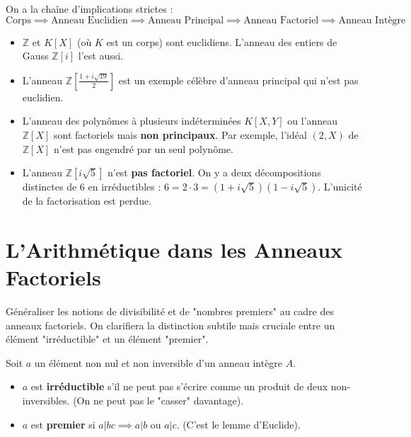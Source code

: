 \begin{theorem}
    On a la chaîne d'implications strictes :
    $$ \text{Corps} \implies \text{Anneau Euclidien} \implies \text{Anneau Principal} \implies \text{Anneau Factoriel} \implies \text{Anneau Intègre} $$
\end{theorem}

\begin{example}
    \begin{itemize}
        \item $\mathbb{Z}$ et $K[X]$ (où $K$ est un corps) sont euclidiens. L'anneau des entiers de Gauss $\mathbb{Z}[i]$ l'est aussi.
        \item L'anneau $\mathbb{Z}[\frac{1+i\sqrt{19}}{2}]$ est un exemple célèbre d'anneau principal qui n'est pas euclidien.
        \item L'anneau des polynômes à plusieurs indéterminées $K[X,Y]$ ou l'anneau $\mathbb{Z}[X]$ sont factoriels mais \textbf{non principaux}. Par exemple, l'idéal $(2,X)$ de $\mathbb{Z}[X]$ n'est pas engendré par un seul polynôme.
        \item L'anneau $\mathbb{Z}[i\sqrt{5}]$ n'est \textbf{pas factoriel}. On y a deux décompositions distinctes de 6 en irréductibles : $6 = 2 \cdot 3 = (1+i\sqrt{5})(1-i\sqrt{5})$. L'unicité de la factorisation est perdue.
    \end{itemize}
\end{example}

\section{L'Arithmétique dans les Anneaux Factoriels}

\begin{objectif}
    Généraliser les notions de divisibilité et de "nombres premiers" au cadre des anneaux factoriels. On clarifiera la distinction subtile mais cruciale entre un élément "irréductible" et un élément "premier".
\end{objectif}

\begin{proposition}
    Soit $a$ un élément non nul et non inversible d'un anneau intègre $A$.
    \begin{itemize}
        \item $a$ est \textbf{irréductible} s'il ne peut pas s'écrire comme un produit de deux non-inversibles. (On ne peut pas le "casser" davantage).
        \item $a$ est \textbf{premier} si $a | bc \implies a|b$ ou $a|c$. (C'est le lemme d'Euclide).
    \end{itemize}
\end{proposition}

